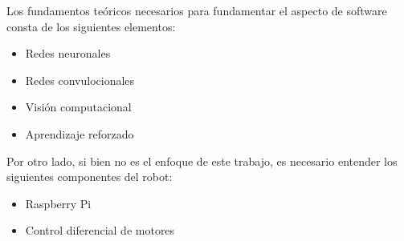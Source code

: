 
Los fundamentos teóricos necesarios para fundamentar el aspecto de software consta de los siguientes elementos:
\begin{itemize}
\item Redes neuronales
\item Redes convulocionales
\item Visión computacional
\item Aprendizaje reforzado
\end{itemize}

Por otro lado, si bien no es el enfoque de este trabajo, es necesario entender los siguientes componentes del robot:
\begin{itemize}
\item Raspberry Pi
\item Control diferencial de motores
\end{itemize}